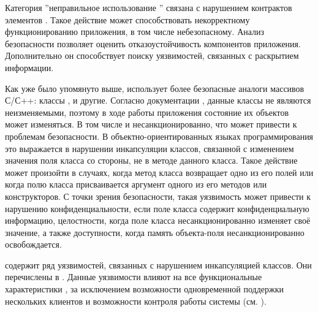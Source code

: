 %
Категория ''неправильное использование '' связана с нарушением контрактов элементов  . 
%
Такое действие может способствовать некорректному функционированию приложения, в том числе небезопасному. 
%
Анализ безопасности   позволяет оценить отказоустойчивость компонентов приложения. 
%
Дополнительно он способствует поиску уязвимостей, связанных с раскрытием информации. 

%
Как уже было упомянуто выше,  использует более безопасные аналоги массивов С/С++: классы ,  и другие. 
%
Согласно документации  , данные классы не являются неизменяемыми, поэтому в ходе работы приложения состояние их объектов  может изменяться. 
%
В том числе и несанкционированно, что может привести к проблемам безопасности.
%
В объектно-ориентированных языках программирования это выражается в нарушении инкапсуляции классов, связанной с изменением значения поля класса со стороны, не в методе данного класса.
%
Такое действие может произойти в случаях, когда метод класса возвращает одно из его полей или когда полю класса присваивается аргумент одного из его методов или конструкторов.
%
С точки зрения безопасности, такая уязвимость может привести к нарушению конфиденциальности, если поле класса содержит конфиденциальную информацию, целостности, когда поле класса несанкционированно изменяет своё значение, а также доступности, когда память объекта-поля несанкционированно освобождается. 

%
  содержит ряд уязвимостей, связанных с нарушением инкапсуляцией классов. Они перечислены в . Данные уязвимости влияют на все функциональные характеристики , за исключением возможности одновременной поддержки нескольких клиентов и возможности контроля работы системы (см. ).

